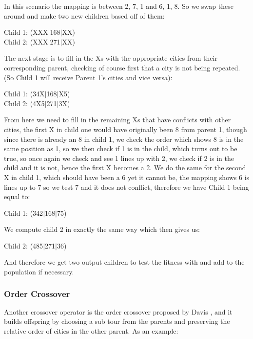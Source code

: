 \documentclass[11pt,a4paper,titlepage]{article}
\begin{document}
In this scenario the mapping is between 2, 7, 1 and 6, 1, 8. So we swap these around and make two new children based off of them:

\begin{center}\Large
Child 1: (XXX$|$168$|$XX)\\
Child 2: (XXX$|$271$|$XX)
\end{center}

The next stage is to fill in the Xs with the appropriate cities from their corresponding parent, checking of course first that a city is not being repeated. (So Child 1 will receive Parent 1's cities and vice versa):

\begin{center}\Large
Child 1: (34X$|$168$|$X5)\\
Child 2: (4X5$|$271$|$3X)
\end{center}

From here we need to fill in the remaining Xs that have conflicts with other cities, the first X in child one would have originally been 8 from parent 1, though since there is already an 8 in child 1, we check the order which shows 8 is in the same position as 1, so we then check if 1 is in the child, which turns out to be true, so once again we check and see 1 lines up with 2, we check if 2 is in the child and it is not, hence the first X becomes a 2. We do the same for the second X in child 1, which should have been a 6 yet it cannot be, the mapping shows 6 is lines up to 7 so we test 7 and it does not conflict, therefore we have Child 1 being equal to:

\begin{center}\Large
Child 1: (342$|$168$|$75)
\end{center}

We compute child 2 in exactly the same way which then gives us:

\begin{center}\Large
Child 2: (485$|$271$|$36)
\end{center}

And therefore we get two output children to test the fitness with and add to the population if necessary.

\subsubsection{Order Crossover}

Another crossover operator is the order crossover proposed by Davis \cite{GACrossover}, and it builds offspring by choosing a sub tour from the parents and preserving the relative order of cities in the other parent. As an example:
\end{document}
